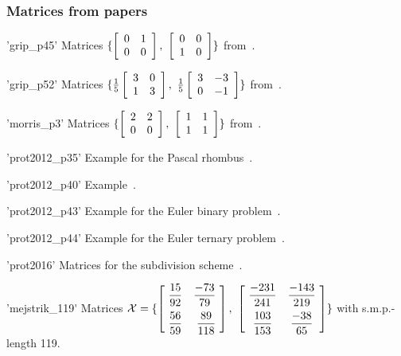 \subsubsection{Matrices from papers}
\begin{param}
\item['grip\_p45'] Matrices 
$\{
\left[\begin{array}{c c}0 & 1\\0& 0\end{array}\right],\  
\left[\begin{array}{c c}0 & 0\\1& 0\end{array}\right]
\}$ 
from~\cite[p.~45]{Grip96}.


\item['grip\_p52'] Matrices 
$\{
\frac{1}{5} \left[\begin{array}{c c}3 & 0\\1& 3\end{array}\right],\  
\frac{1}{5} \left[\begin{array}{c c}3 & -3\\0& -1\end{array}\right]
\}$ 
from~\cite[p.~52]{Grip96}. 


\item['morris\_p3'] Matrices 
$\{
\left[\begin{array}{c c}2 & 2\\0& 0\end{array}\right],\  
\left[\begin{array}{c c}1 & 1\\1& 1\end{array}\right]
\}$ 
from~\cite[p.~3]{Morris2010}.
\item['prot2012\_p35'] Example for the Pascal rhombus~\cite[p.~35]{GP13}.
\item['prot2012\_p40'] Example~\cite[p.~40]{GP13}.
\item['prot2012\_p43'] Example for the Euler binary problem~\cite[p.~43]{GP13}.
\item['prot2012\_p44'] Example for the Euler ternary problem~\cite[p.~44]{GP13}.
\item['prot2016'] Matrices for the subdivision scheme~\cite[p.~33, p.~35, p.~50]{GP13}.

\item['mejstrik\_119\'] Matrices $\mathcal{X}=
\{
\left[\!\begin{array}{r r}
\dfrac{15}{92} & \dfrac{-73}{79}\\[2.ex]
\dfrac{56}{59}  & \dfrac{89}{118}\end{array}\!\right]
,\
\left[\!\begin{array}{c c}
\dfrac{-231}{241} & \dfrac{-143}{219}\\[2.ex]
\dfrac{103}{153}  & \dfrac{-38}{65}\end{array}\!\right]
\}
$ with s.m.p.-length 119.


\end{param}

